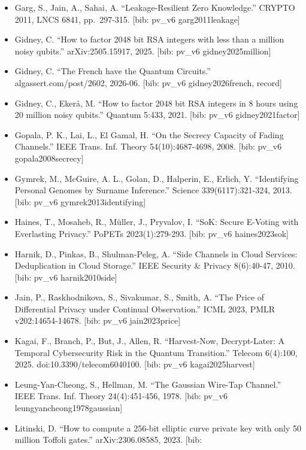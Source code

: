 \documentclass[
  11pt,
]{article}
\begin{document}
\begin{itemize}
\item
  Garg, S., Jain, A., Sahai, A. ``Leakage-Resilient Zero Knowledge.''
  CRYPTO 2011, LNCS 6841, pp.~297-315. {[}bib: pv\_v6 garg2011leakage{]}
\item
  Gidney, C. ``How to factor 2048 bit RSA integers with less than a
  million noisy qubits.'' arXiv:2505.15917, 2025. {[}bib: pv\_v6
  gidney2025million{]}
\item
  Gidney, C. ``The French have the Quantum Circuits.''
  algassert.com/post/2602, 2026-06. {[}bib: pv\_v6 gidney2026french,
  record{]}
\item
  Gidney, C., Ekerå, M. ``How to factor 2048 bit RSA integers in 8 hours
  using 20 million noisy qubits.'' Quantum 5:433, 2021. {[}bib: pv\_v6
  gidney2021factor{]}
\item
  Gopala, P. K., Lai, L., El Gamal, H. ``On the Secrecy Capacity of
  Fading Channels.'' IEEE Trans. Inf. Theory 54(10):4687-4698, 2008.
  {[}bib: pv\_v6 gopala2008secrecy{]}
\item
  Gymrek, M., McGuire, A. L., Golan, D., Halperin, E., Erlich, Y.
  ``Identifying Personal Genomes by Surname Inference.'' Science
  339(6117):321-324, 2013. {[}bib: pv\_v6 gymrek2013identifying{]}
\item
  Haines, T., Mosaheb, R., Müller, J., Pryvalov, I. ``SoK: Secure
  E-Voting with Everlasting Privacy.'' PoPETs 2023(1):279-293. {[}bib:
  pv\_v6 haines2023sok{]}
\item
  Harnik, D., Pinkas, B., Shulman-Peleg, A. ``Side Channels in Cloud
  Services: Deduplication in Cloud Storage.'' IEEE Security \& Privacy
  8(6):40-47, 2010. {[}bib: pv\_v6 harnik2010side{]}
\item
  Jain, P., Raskhodnikova, S., Sivakumar, S., Smith, A. ``The Price of
  Differential Privacy under Continual Observation.'' ICML 2023, PMLR
  v202:14654-14678. {[}bib: pv\_v6 jain2023price{]}
\item
  Kagai, F., Branch, P., But, J., Allen, R. ``Harvest-Now,
  Decrypt-Later: A Temporal Cybersecurity Risk in the Quantum
  Transition.'' Telecom 6(4):100, 2025. doi:10.3390/telecom6040100.
  {[}bib: pv\_v6 kagai2025harvest{]}
\item
  Leung-Yan-Cheong, S., Hellman, M. ``The Gaussian Wire-Tap Channel.''
  IEEE Trans. Inf. Theory 24(4):451-456, 1978. {[}bib: pv\_v6
  leungyancheong1978gaussian{]}
\item
  Litinski, D. ``How to compute a 256-bit elliptic curve private key
  with only 50 million Toffoli gates.'' arXiv:2306.08585, 2023. {[}bib:

\end{itemize}
\end{document}
